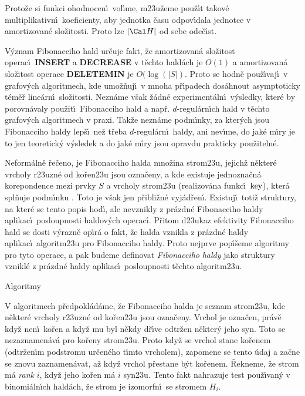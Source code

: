 \flushpar Proto\v ze si funkci ohodnocen\'\i\ vol\'\i me, 
m\accent23u\v zeme pou\v z\'\i t takov\'e multiplikativn\'\i\ 
koeficienty, aby jednotka \v casu odpov\'\i dala jednotce v 
amortizovan\'e slo\v zitosti. Proto lze $|\Cal H|$ od sebe ode\v c\'\i st.
\bigskip

\centerline{}
\medskip

\flushpar V\'yznam Fibonacciho hald ur\v cuje fakt, \v ze amortizovan\'a 
slo\v zitost operac\'\i\ {\bf INSERT} a {\bf DECREASE} v t\v echto hald\'ach je 
$O(1)$ a amortizovan\'a slo\v zitost operace {\bf DELETEMIN} je $
O(\log(|S|)$. 
Proto se hodn\v e pou\v z\'\i vaj\'\i\ v grafov\'ych algoritmech, 
kde umo\v z\v nuj\'\i\ v mnoha p\v r\'\i padech dos\'ahnout asymptoticky t\'em\v e\v r line\'arn\'\i\ 
slo\v zitosti. Nezn\'ame v\v sak \v z\'adn\'e  
expe\-riment\'aln\'\i\ v\'ysledky, kter\'e by porovn\'avaly pou\v zit\'\i\ Fibonacciho 
hald a nap\v r. $d$-regul\'arn\'\i ch hald v t\v echto grafov\'ych 
algoritmech v praxi. Tak\v ze nezn\'ame podm\'\i nky, za 
kter\'ych jsou Fibonacciho 
haldy lep\v s\'\i\ ne\v z t\v reba $d$-regul\'arn\'\i\ haldy, 
ani nev\'\i me, do jak\'e m\'\i ry je to jen teoretick\'y 
v\'ysledek a do jak\'e m\'\i ry jsou opravdu prakticky pou\v ziteln\'e. 
\medskip

\flushpar Neform\'aln\v e \v re\v ceno, je Fibonacciho halda mno\v zina 
strom\accent23u, jejich\v z n\v ekter\'e vrcholy r\accent23uzn\'e od 
ko\v ren\accent23u jsou ozna\v ceny, a kde existuje 
jednozna\v cn\'a korepondence mezi prvky $S$ a vrcholy 
strom\accent23u (realizov\'ana funkc\'\i\ $\operatorname{key}$), kter\'a spl\v nuje 
podm\'\i nku \thetag{usp}.  Toto je v\v sak jen p\v ribli\v z\-n\'e 
vyj\'ad\v ren\'\i .  Existuj\'\i\ toti\v z struktury, na kter\'e se tento 
popis hod\'\i , ale 
nevznikly z pr\'azd\-n\'e Fibonacciho haldy aplikac\'\i\ 
posloupnosti haldov\'ych  
operac\'\i .  P\v ritom d\accent23ukaz efekti\-vity Fibonacciho hald se 
dosti v\'yrazn\v e op\'\i r\'a o fakt, \v ze halda vznikla z pr\'azdn\'e 
haldy aplikac\'\i\ algoritm\accent23u pro Fibonacciho 
haldy. Proto nejprve pop\'\i\v seme algoritmy pro tyto 
ope\-race, a pak budeme
definovat \emph{Fibonacciho} \emph{haldy} jako struktury 
vznikl\'e z pr\'azdn\'e haldy aplikac\'\i\ posloupnosti 
t\v echto algoritm\accent23u.
\bigskip

\head
Algoritmy
\endhead

\flushpar V algoritmech p\v redpokl\'ad\'ame, \v ze Fibonacciho halda je 
seznam strom\accent23u, kde n\v ekter\'e vrcholy r\accent23uzn\'e od 
ko\v ren\accent23u jsou ozna\v ceny.  Vrchol je ozna\v cen, pr\'av\v e kdy\v z nen\'\i\ 
ko\v ren a kdy\v z mu byl n\v ekdy d\v r\'\i ve odtr\v zen n\v ekter\'y jeho syn. Toto se 
nezaznamen\'av\'a pro ko\v reny strom\accent23u. Proto kdy\v z se 
vrchol stane ko\v renem (odtr\v zen\'\i m podstromu ur\v cen\'eho 
t\'\i mto vrcholem),  
zapomene  se tento \'udaj a za\v cne se znovu zaznamen\'avat, 
a\v z kdy\v z vrchol p\v restane 
b\'yt ko\v renem. \v Rekneme, \v ze strom m\'a \emph{rank} $i$, kdy\v z 
jeho ko\v ren 
m\'a $i$ syn\accent23u. Tento fakt nahrazuje test pou\v z\'\i van\'y 
v binomi\'aln\'\i ch 
hald\'ach, \v ze strom je izomorfn\'\i\ se stromem $H_i$. 
\medskip

